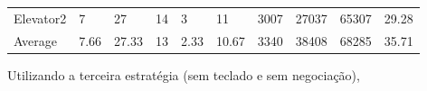 ﻿\documentclass[a4paper]{article}
\begin{document}
\begin{table}[h]
\begin{tabular}{@{}llllllllll@{}}
Elevator2 & 7        & 27            & 14           & 3                                                               & 11                                                                  & 3007                                                         & 27037                                                 & 65307                                                   & 29.28         \\
Average   & 7.66     & 27.33         & 13        & 2.33                                                               & 10.67 & 3340                                                         & 38408                                                 & 68285                                                   & 35.71          \\ \bottomrule
\end{tabular}
\end{table}

Utilizando a terceira estratégia (sem teclado e sem negociação),
\end{document}
